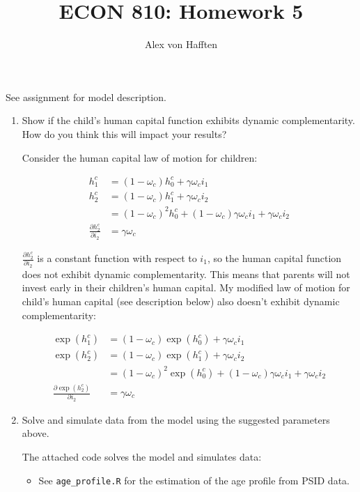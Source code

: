 \documentclass{article}
\title{ECON 810: Homework 5}
\author{Alex von Hafften }
\begin{document}
\maketitle

See assignment for model description.

\begin{enumerate}

\item Show if the child's human capital function exhibits dynamic complementarity.  How do you think this will impact your results?

Consider the human capital law of motion for children:

\begin{align*}
h^{c}_1 
&= (1 - \omega_c) h^c_0 + \gamma \omega_c i_1\\
h^{c}_2 
&= (1 - \omega_c) h^c_1 + \gamma \omega_c i_2\\
&= (1 - \omega_c)^2 h^c_0 + (1 - \omega_c) \gamma \omega_c i_1 + \gamma \omega_c i_2 \\
\frac{\partial h^{c}_2}{\partial i_2} &= \gamma \omega_c
\end{align*}

$\frac{\partial h^{c}_2}{\partial i_2}$ is a constant function with respect to $i_1$, so the human capital function does not exhibit dynamic complementarity.  This means that parents will not invest early in their children's human capital. My modified law of motion for child's human capital (see description below) also doesn't exhibit dynamic complementarity:

\begin{align*}
\exp(h^{c}_1)
&= (1 - \omega_c) \exp(h^c_0) + \gamma \omega_c i_1\\
\exp(h^{c}_2 )
&= (1 - \omega_c) \exp(h^c_1) + \gamma \omega_c i_2\\
&= (1 - \omega_c)^2 \exp(h^c_0) + (1 - \omega_c) \gamma \omega_c i_1 + \gamma \omega_c i_2 \\
\frac{\partial \exp(h^{c}_2)}{\partial i_2} &= \gamma \omega_c
\end{align*}

\item Solve and simulate data from the model using the suggested parameters above.

The attached code solves the model and simulates data:

\begin{itemize}

\item See \texttt{age\_profile.R} for the estimation of the age profile from PSID data.


\end{itemize}
\end{enumerate}
\end{document}
